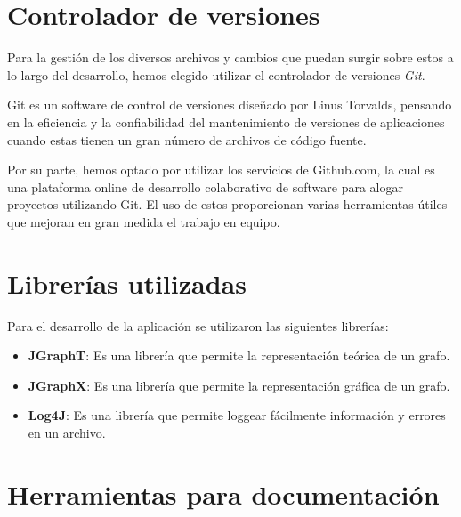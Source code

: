 \documentclass{book}
\begin{document}
\section{Controlador de versiones}

Para la gestión de los diversos archivos y cambios que puedan surgir sobre estos a lo largo del desarrollo, hemos elegido utilizar el controlador de versiones \textit{Git}. 
\par
Git es un software de control de versiones diseñado por Linus Torvalds, pensando en la eficiencia y la confiabilidad del mantenimiento de versiones de aplicaciones cuando estas tienen un gran número de archivos de código fuente.
\par
Por su parte, hemos optado por utilizar los servicios de Github.com, la cual es una plataforma online de desarrollo colaborativo de software para alogar proyectos utilizando Git. El uso de estos proporcionan varias herramientas útiles que mejoran en gran medida el trabajo en equipo.
\medskip

\section{Librerías utilizadas}
Para el desarrollo de la aplicación se utilizaron las siguientes librerías:
\begin{itemize}
		\renewcommand{\labelitemi}{\scriptsize\tiny$\blacksquare$} 
		\itemsep=10pt \topsep=0pt \partopsep=0pt \parskip=0pt \parsep=10pt
		
		\item \textbf{JGraphT}: Es una librería que permite la representación teórica de un grafo.
		
		\item \textbf{JGraphX}: Es una librería que permite la representación gráfica de un grafo.

		\item \textbf{Log4J}: Es una librería que permite loggear fácilmente información y errores en un archivo. 

	\end{itemize}


\section{Herramientas para documentación}
\end{document}
